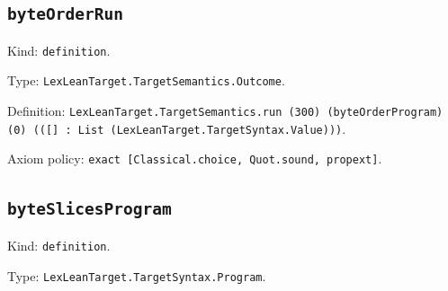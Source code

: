\documentclass[11pt]{article}
\begin{document}
\subsection*{\texttt{byteOrderRun}}
\noindent Kind: \texttt{definition}.\par
\noindent Type: \texttt{LexLeanTarget.TargetSemantics.Outcome}.\par
\noindent Definition: \texttt{LexLeanTarget.TargetSemantics.run (300) (byteOrderProgram) (0) (([] : List (LexLeanTarget.TargetSyntax.Value)))}.\par
\noindent Axiom policy: \texttt{exact [Classical.choice, Quot.sound, propext]}.\par
\subsection*{\texttt{byteSlicesProgram}}
\noindent Kind: \texttt{definition}.\par
\noindent Type: \texttt{LexLeanTarget.TargetSyntax.Program}.\par
\end{document}
